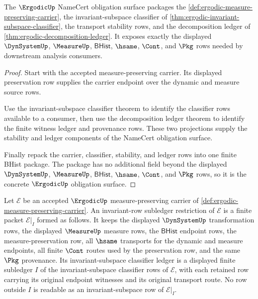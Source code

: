 \begin{theorem}
\label{thm:ergodic-namecert-obligation-surface}
The $\ErgodicUp$ NameCert obligation surface packages the
\autoref{def:ergodic-measure-preserving-carrier}, the invariant-subspace
classifier of \autoref{thm:ergodic-invariant-subspace-classifier}, the
transport stability rows, and the decomposition ledger of
\autoref{thm:ergodic-decomposition-ledger}. It exposes exactly the displayed
$\DynSystemUp$, $\MeasureUp$, $\mathsf{BHist}$, $\hsame$, $\Cont$, and $\Pkg$
rows needed by downstream analysis consumers.
\end{theorem}
\begin{proof}
Start with the accepted measure-preserving carrier. Its displayed preservation
row supplies the carrier endpoint over the dynamic and measure source rows.

Use the invariant-subspace classifier theorem to identify the classifier rows
available to a consumer, then use the decomposition ledger theorem to identify
the finite witness ledger and provenance rows. These two projections supply the
stability and ledger components of the NameCert obligation surface.

Finally repack the carrier, classifier, stability, and ledger rows into one
finite BHist package. The package has no additional field beyond the displayed
$\DynSystemUp$, $\MeasureUp$, $\mathsf{BHist}$, $\hsame$, $\Cont$, and $\Pkg$
rows, so it is the concrete $\ErgodicUp$ obligation surface.
\end{proof}

\begin{definition}
\label{def:ergodic-invariant-row-subledger-restriction}
Let $\mathcal E$ be an accepted $\ErgodicUp$ measure-preserving carrier of \autoref{def:ergodic-measure-preserving-carrier}. An invariant-row subledger restriction of $\mathcal E$ is a finite packet $\mathcal E|_I$ formed as follows. It keeps the displayed $\DynSystemUp$ transformation rows, the displayed $\MeasureUp$ measure rows, the $\mathsf{BHist}$ endpoint rows, the measure-preservation row, all $\hsame$ transports for the dynamic and measure endpoints, all finite $\Cont$ routes used by the preservation row, and the same $\Pkg$ provenance. Its invariant-subspace classifier ledger is a displayed finite subledger $I$ of the invariant-subspace classifier rows of $\mathcal E$, with each retained row carrying its original endpoint witnesses and its original transport route. No row outside $I$ is readable as an invariant-subspace row of $\mathcal E|_I$.
\end{definition}


